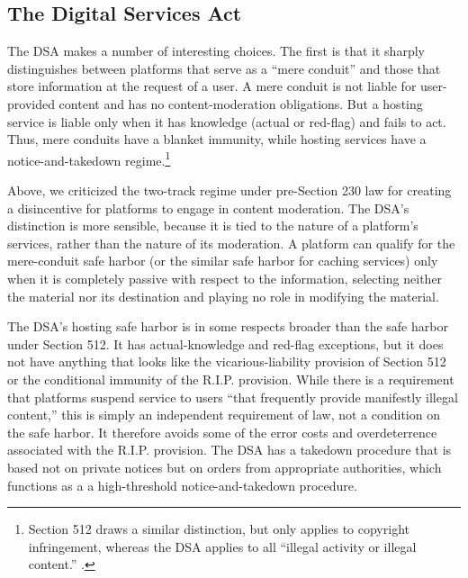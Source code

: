 \subsection{The Digital Services Act}

The DSA makes a number of interesting choices. The first is that it sharply distinguishes between platforms that serve as a ``mere conduit'' and those that store information at the request of a user. A mere conduit is not liable for user-provided content and has no content-moderation obligations. But a hosting service is liable only when it has knowledge (actual or red-flag) and fails to act. Thus, mere conduits have a blanket immunity, while hosting services have a notice-and-takedown regime.\footnote{Section 512 draws a similar distinction, but only applies to copyright infringement, whereas the DSA applies to all ``illegal activity or illegal content.'' .}

Above, we criticized the two-track regime under pre-Section 230 law for creating a disincentive for platforms to engage in content moderation. The DSA's distinction is more sensible, because it is tied to the nature of a platform's services, rather than the nature of its moderation. A platform can qualify for the mere-conduit safe harbor (or the similar safe harbor for caching services) only when it is completely passive with respect to the information, selecting neither the material nor its destination and playing no role in modifying the material. 

The DSA's hosting safe harbor is in some respects broader than the safe harbor under Section 512. It has actual-knowledge and red-flag exceptions, but it does not have anything that looks like the vicarious-liability provision of Section 512 or the conditional immunity of the R.I.P. provision. While there is a requirement that platforms suspend service to users ``that frequently provide manifestly illegal content,'' this is simply an independent requirement of law, not a condition on the safe harbor. It therefore avoids some of the error costs and overdeterrence associated with the R.I.P. provision. The DSA has a takedown procedure that is based not on private notices but on orders from appropriate authorities, which  functions as a a high-threshold notice-and-takedown procedure.

